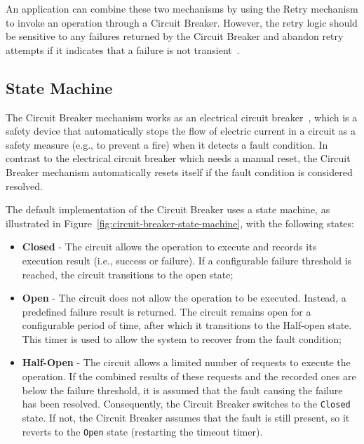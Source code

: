 An application can combine these two mechanisms by using the Retry mechanism to invoke an operation through a Circuit Breaker.
However,
the retry logic should be sensitive to any failures returned by the Circuit Breaker
and abandon retry attempts
if it indicates that a failure is not transient~\cite{microsoft-cbreaker-pattern}.

\subsection{State Machine}\label{subsec:cbreaker-state-machine}

The Circuit Breaker mechanism works as an electrical circuit breaker~\cite{electrical-circuit-breaker},
which is a safety device that automatically stops the flow of electric current in a circuit as a safety measure
(e.g., to prevent a fire) when it detects a fault condition.
In contrast to the electrical circuit breaker which needs a manual reset,
the Circuit Breaker mechanism automatically resets itself if the fault condition is considered resolved.

The default implementation of the Circuit Breaker uses a state machine,
as illustrated in Figure~\ref{fig:circuit-breaker-state-machine}, with the following states:

\begin{itemize}
    \item \textbf{Closed} - The circuit allows the operation to execute and records its execution result
    (i.e., success or failure).
    If a configurable failure threshold is reached, the circuit transitions to the open state;
    \item \textbf{Open} - The circuit does not allow the operation to be executed.
    Instead, a predefined failure result is returned.
    The circuit remains open for a configurable period of time, after which it transitions to the Half-open state.
    This timer is used to allow the system to recover from the fault condition;
    \item \textbf{Half-Open} - The circuit allows a limited number of requests to execute the operation.
    If the combined results of these requests and the recorded ones are below the failure threshold, it is assumed that the fault causing the failure has been resolved.
    Consequently, the Circuit Breaker switches to the \texttt{Closed} state.
    If not,
    the Circuit Breaker assumes that the fault is still present,
    so it reverts to the \texttt{Open} state (restarting the timeout timer).
\end{itemize}


